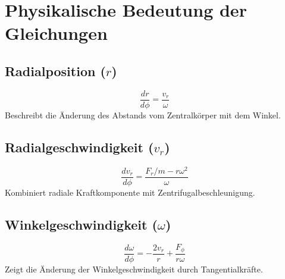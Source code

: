 \section{Physikalische Bedeutung der Gleichungen}
\subsection{Radialposition ($r$)}
\[
\frac{dr}{d\phi} = \frac{v_r}{\omega}
\]
Beschreibt die Änderung des Abstands vom Zentralkörper mit dem Winkel.

\subsection{Radialgeschwindigkeit ($v_r$)}
\[
\frac{dv_r}{d\phi} = \frac{F_r/m - r\omega^2}{\omega}
\]
Kombiniert radiale Kraftkomponente mit Zentrifugalbeschleunigung.

\subsection{Winkelgeschwindigkeit ($\omega$)}
\[
\frac{d\omega}{d\phi} = -\frac{2v_r}{r} + \frac{F_\phi}{r\omega}
\]
Zeigt die Änderung der Winkelgeschwindigkeit durch Tangentialkräfte.